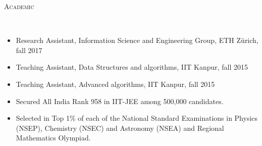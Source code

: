 \documentclass[9pt]{article}
\newenvironment{changemargin}[2]{%
  \begin{list}{}{%
      \setlength{\topsep}{0pt}%
    \setlength{\leftmargin}{#1}%
    \setlength{\rightmargin}{#2}%
    \setlength{\listparindent}{\parindent}%
  \setlength{\itemindent}{\parindent}%
    \setlength{\parsep}{\parskip}%
    }%
  \item[]}{\end{list}
    }
\newcommand{\lineover}{
  \begin{changemargin}{-0.05in}{-0.10in}
    \vspace*{-9pt}
    \hrulefill \\
    \vspace*{-2pt}
  \end{changemargin}
}
\newcommand{\header}[1]{
  \begin{changemargin}{-0.5in}{-0.5in}
    \scshape{#1}\\
        \lineover
  \end{changemargin}
}
\newenvironment{body} {
  \vspace*{-16pt}
        \begin{changemargin}{-0.6in}{-0.65in}
        }	
        {\end{changemargin}
}
\begin{document}


\vspace{2 mm}
\header{Academic}
\begin{body}
  \vspace{14pt}
        \begin{changemargin}{0.15in}{0.15in}
          \begin{itemize}
            \item Research Assistant, Information Science and Engineering Group, ETH Z{\"u}rich, fall 2017
            \item Teaching Assistant, Data Structures and algorithms, IIT Kanpur, fall 2015
            \item Teaching Assistant, Advanced algorithms, IIT Kanpur, fall 2015
            \item Secured All India Rank 958 in IIT-JEE among 500,000 candidates.
            \item Selected in Top 1\% of each of the National Standard Examinations 
              in Physics (NSEP), Chemistry (NSEC) and Astronomy (NSEA) and Regional
              Mathematics Olympiad.
          \end{itemize}
        \end{changemargin}
\end{body}
\end{document}
